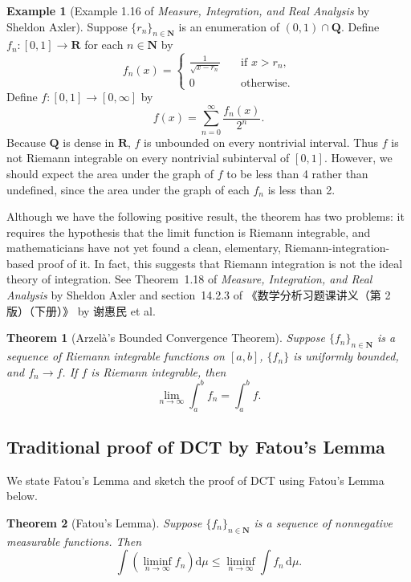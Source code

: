 \documentclass[11pt,a4paper]{article}
\theoremstyle{plain} %
\newtheorem*{theorem}{Theorem}
\theoremstyle{definition}
\newtheorem*{example}{Example}
\theoremstyle{remark}
\newcommand{\bra}[1]{\mathopen{}\left(#1\right)}
\newcommand{\R}{\mathbf{R}}
\newcommand{\N}{\mathbf{N}}
\newcommand{\Q}{\mathbf{Q}}
\renewcommand{\d}{\mathrm{d}}
\newcommand{\nti}{n\to\infty}
\begin{document}
\begin{example}[Example 1.16 of \emph{Measure, Integration, and Real Analysis} by Sheldon Axler]
    Suppose $\{r_n\}_{n\in\N}$ is an enumeration of $(0,1)\cap\Q$. Define $f_n:[0,1]\to\R$ for each $n\in\N$ by
    \[f_n(x)=\begin{cases}
        \frac1{\sqrt{x-r_n}}\quad&\text{if }x>r_n,\\
        0&\text{otherwise}.
    \end{cases}\]
    Define $f:[0,1]\to[0,\infty]$ by
    \[f(x)=\sum_{n=0}^{\infty}\frac{f_n(x)}{2^n}.\]
    Because $\Q$ is dense in $\R$, $f$ is unbounded on every nontrivial interval. Thus $f$ is not Riemann integrable on every nontrivial subinterval of $[0,1]$. However, we should expect the area under the graph of $f$ to be less than 4 rather than undefined, since the area under the graph of each $f_n$ is less than 2.
\end{example}

Although we have the following positive result, the theorem has two problems: it requires the hypothesis that the limit function is Riemann integrable, and mathematicians have not yet found a clean, elementary, Riemann-integration-based proof of it. In fact, this suggests that Riemann integration is not the ideal theory of integration. See Theorem~1.18 of \emph{Measure, Integration, and Real Analysis} by Sheldon Axler and section~14.2.3 of 《数学分析习题课讲义（第 2 版）（下册）》 by 谢惠民 et al.

\begin{theorem}[Arzelà's Bounded Convergence Theorem]
    Suppose $\{f_n\}_{n\in\N}$ is a sequence of Riemann integrable functions on $[a,b]$, $\{f_n\}$ is uniformly bounded, and $f_n\to f$. If $f$ is Riemann integrable, then
    \[\lim_{\nti}\int_a^bf_n=\int_a^bf.\]
\end{theorem}

\subsection{Traditional proof of DCT by Fatou's Lemma}
\label{subsec:proof_dct_fatou}
We state Fatou's Lemma and sketch the proof of DCT using Fatou's Lemma below.

\begin{theorem}[Fatou's Lemma]
    Suppose $\{f_n\}_{n\in\N}$ is a sequence of nonnegative measurable functions. Then
    \[\int\bra{\liminf_{\nti}f_n}\d\mu\le\liminf_{\nti}\int f_n\,\d\mu.\]
\end{theorem}
\end{document}

